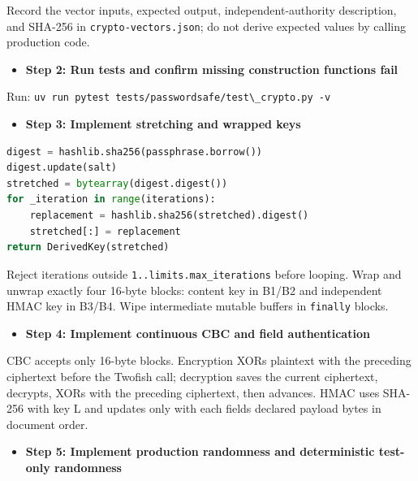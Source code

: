 \documentclass[
  letterpaper,
]{article}
\newcommand{\passthrough}[1]{#1}
\providecommand{\tightlist}{%
  \setlength{\itemsep}{0pt}\setlength{\parskip}{0pt}}
\begin{document}
Record the vector inputs, expected output, independent-authority description, and SHA-256 in
\nolinkurl{crypto-vectors.json}; do not derive expected values by calling production code.

\begin{itemize}
\tightlist
\item[$\square$]
  \textbf{Step 2: Run tests and confirm missing construction functions fail}
\end{itemize}

Run: \passthrough{\lstinline!uv run pytest tests/passwordsafe/test\_crypto.py -v!}

\begin{itemize}
\tightlist
\item[$\square$]
  \textbf{Step 3: Implement stretching and wrapped keys}
\end{itemize}

\begin{lstlisting}[language=Python]
digest = hashlib.sha256(passphrase.borrow())
digest.update(salt)
stretched = bytearray(digest.digest())
for _iteration in range(iterations):
    replacement = hashlib.sha256(stretched).digest()
    stretched[:] = replacement
return DerivedKey(stretched)
\end{lstlisting}

Reject iterations outside \nolinkurl{1..limits.max_iterations} before looping. Wrap and unwrap exactly four 16-byte
blocks: content key in B1/B2 and independent HMAC key in B3/B4. Wipe intermediate mutable buffers in
\passthrough{\lstinline!finally!} blocks.

\begin{itemize}
\tightlist
\item[$\square$]
  \textbf{Step 4: Implement continuous CBC and field authentication}
\end{itemize}

CBC accepts only 16-byte blocks. Encryption XORs plaintext with the preceding ciphertext before the Twofish call;
decryption saves the current ciphertext, decrypts, XORs with the preceding ciphertext, then advances. HMAC uses SHA-256
with key L and updates only with each field\textquotesingle s declared payload bytes in document order.

\begin{itemize}
\tightlist
\item[$\square$]
  \textbf{Step 5: Implement production randomness and deterministic test-only randomness}
\end{itemize}
\end{document}
